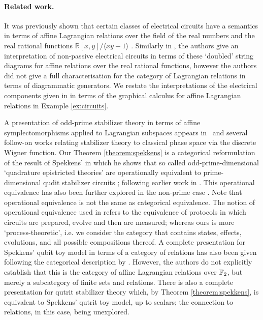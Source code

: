 \paragraph{Related work.} It was previously shown that certain classes of electrical circuits have a semantics in terms of affine Lagrangian relations over the field of the real numbers and the real rational functions ${\mathbb{R}[x,y]/\langle xy-1\rangle}$ \cite{network,passive}. Similarly in \cite[\S VI]{affine}, the authors give an interpretation of non-passive electrical circuits in terms of these `doubled' string diagrams for affine relations over the real rational functions, however the authors did not give a full characterisation for the category of Lagrangian relations in terms of diagrammatic generators.
We restate the interpretations of the electrical components given in  \cite[\S VI]{affine} in terms of the graphical calculus for affine Lagrangian relations in Example \ref{ex:circuits}.

A presentation of odd-prime stabilizer theory in terms of affine symplectomorphisms applied to Lagrangian subspaces appears in~\cite{gross} and several follow-on works relating stabilizer theory to classical phase space via the discrete Wigner function. Our Theorem \ref{theorem:spekkens} is a categorical reformulation of the result of Spekkens' in which he shows that so called odd-prime-dimensional `quadrature epistricted theories' are operationally equivalent to prime-dimensional qudit stabilizer circuits \cite{spekkens2016quasi}; following earlier work in \cite{spekkens}.  This operational equivalence has also been further explored in the non-prime case \cite{catani}. Note that operational equivalence is not the same as categorical equivalence. The notion of operational equivalence used in \cite{spekkens2016quasi,catani}  refers to the equivalence of protocols in which circuits are prepared, evolve and then are measured; whereas ours is more `process-theoretic', i.e. we consider the category that contains states, effects, evolutions, and all possible compositions thereof. A complete presentation for Spekkens' qubit toy model in terms of a category of relations has also been given \cite{backensspek} following the categorical description by \cite{coecke2012spekkens}.  However, the authors do not explicitly establish that this is the category of affine Lagrangian relations over $\mathbb{F}_2$, but merely a subcategory of finite sets and relations. There is also a complete presentation for qutrit stabilizer theory \cite{qutrit} which, by Theorem \ref{theorem:spekkens}, is equivalent to Spekkens' qutrit toy model, up to scalars; the connection to relations, in this case, being unexplored.

